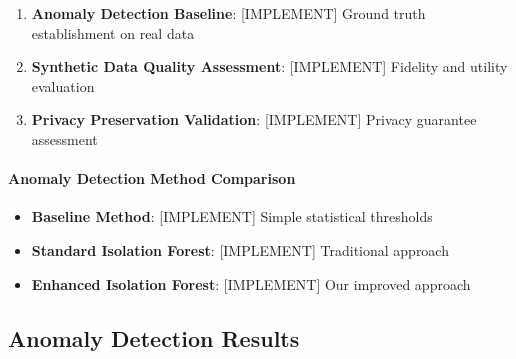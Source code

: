 \documentclass[runningheads]{llncs}
\begin{document}
\begin{enumerate}
\item \textbf{Anomaly Detection Baseline}: [IMPLEMENT] Ground truth establishment on real data

\item \textbf{Synthetic Data Quality Assessment}: [IMPLEMENT] Fidelity and utility evaluation

\item \textbf{Privacy Preservation Validation}: [IMPLEMENT] Privacy guarantee assessment
\end{enumerate}

\paragraph{Anomaly Detection Method Comparison}

\begin{itemize}
\item \textbf{Baseline Method}: [IMPLEMENT] Simple statistical thresholds

\item \textbf{Standard Isolation Forest}: [IMPLEMENT] Traditional approach

\item \textbf{Enhanced Isolation Forest}: [IMPLEMENT] Our improved approach
\end{itemize}


\subsection{Anomaly Detection Results}
\label{sec:results}
\end{document}
